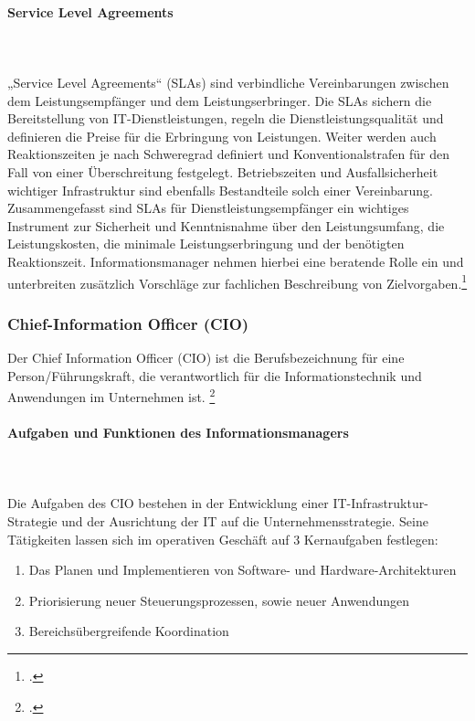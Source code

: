 \paragraph{Service Level Agreements}\mbox{}\\\\
„Service Level Agreements“ (SLAs) sind verbindliche Vereinbarungen zwischen dem Leistungsempfänger und dem Leistungserbringer. Die SLAs sichern die Bereitstellung von IT-Dienstleistungen, regeln die Dienstleistungsqualität und definieren die Preise für die Erbringung von Leistungen. Weiter werden auch Reaktionszeiten je nach Schweregrad definiert und Konventionalstrafen für den Fall von einer Überschreitung festgelegt. Betriebszeiten und Ausfallsicherheit wichtiger Infrastruktur sind ebenfalls Bestandteile solch einer Vereinbarung.
Zusammengefasst sind SLAs für Dienstleistungsempfänger ein wichtiges Instrument zur Sicherheit und Kenntnisnahme über den Leistungsumfang, die Leistungskosten, die minimale Leistungserbringung und der benötigten Reaktionszeit. Informationsmanager nehmen hierbei eine beratende Rolle ein und unterbreiten zusätzlich Vorschläge zur fachlichen Beschreibung von Zielvorgaben.\footcite{Zitat fehlt}


\subsubsection{Chief-Information Officer (CIO)}
\label{cio_text}
Der Chief Information Officer (CIO) ist die Berufsbezeichnung für eine Person/Führungskraft, die verantwortlich für die Informationstechnik und Anwendungen im Unternehmen ist. \footcite{Zitat fehlt}


\paragraph{Aufgaben und Funktionen des Informationsmanagers}\mbox{}\\\\
Die Aufgaben des CIO bestehen in der Entwicklung einer IT-Infrastruktur-Strategie und der Ausrichtung der IT auf die Unternehmensstrategie. Seine Tätigkeiten lassen sich im operativen Geschäft auf 3 Kernaufgaben festlegen: 
\begin{enumerate}
    \item Das Planen und Implementieren von Software- und Hardware-Architekturen 
    \item Priorisierung neuer Steuerungsprozessen, sowie neuer Anwendungen
    \item Bereichsübergreifende Koordination
\end{enumerate}

